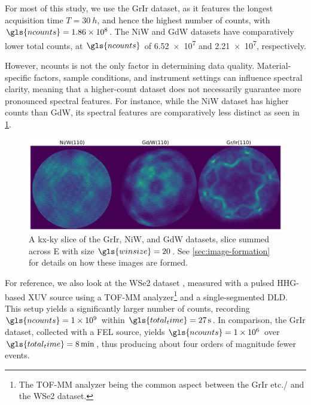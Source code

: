 For most of this study, we use the \gls{GrIr} dataset, as it features the longest acquisition time $T=\qty{30}{h}$, and hence the highest number of counts, with $\gls{ncounts}=\num{1.86e8}$. The \gls{NiW} and \gls{GdW} datasets have comparatively lower total counts, at $\gls{ncounts}$ of \num{6.52e7} and \num{2.21e7}, respectively. 

However, \gls{ncounts} is not the only factor in determining data quality. Material-specific factors, sample conditions, and instrument settings can influence spectral clarity, meaning that a higher-count dataset does not necessarily guarantee more pronounced spectral features. For instance, while the \gls{NiW} dataset has higher counts  than \gls{GdW}, its spectral features are comparatively less distinct as seen in \cref{fig:all-hextof-datasets-kxky}.

\begin{figure}[h]
    \centering
    \includegraphics[width=1\linewidth]{images/datasets_3_kx_ky.pdf}
    \caption{A \gls{kx}-\gls{ky} slice of the \gls{GrIr}, \gls{NiW}, and \gls{GdW} datasets, slice summed across \gls{E} with size $\gls{winsize}=\num{20}$. See \cref{sec:image-formation} for details on how these images are formed.}
    \label{fig:all-hextof-datasets-kxky}
\end{figure}

For reference, we also look at the \gls{WSe2} dataset \cite{maklarTimeresolvedARPESRAW2022}, measured with a pulsed \gls{HHG}-based \gls{XUV} source using a \gls{TOF}-\gls{MM} analyzer\footnote{The \gls{TOF}-\gls{MM} analyzer being the common aspect between the \gls{GrIr} etc./ and the \gls{WSe2} dataset.} and a single-segmented \gls{DLD}. This setup yields a significantly larger number of counts, recording $\gls{ncounts}=\num{1e9}$ within $\gls{total_time}=\qty{27}{s}$. In comparison, the \gls{GrIr} dataset, collected with a \gls{FEL} source, yields $\gls{ncounts} = \num{1e6}$ over $\gls{total_time} = \qty{8}{\min}$, thus producing about four orders of magnitude fewer events.

